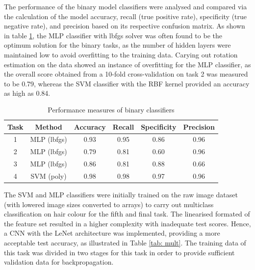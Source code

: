 \documentclass[conference]{IEEEtran}
\begin{document}
The performance of the binary model classifiers were analysed and compared via the calculation of the model accuracy, recall (true positive rate), specificity (true negative rate), and precision based on its respective confusion matrix. 
As shown in table \ref{tab: bin}, the MLP classifier with lbfgs solver was often found to be the optimum solution for the binary tasks, as the number of hidden layers were maintained low to avoid overfitting to the training data. 
Carying out rotation estimation on the data showed an instance of overfitting for the MLP classifier, as the overall score obtained from a 10-fold cross-validation on task 2 was measured to be 0.79, whereas the SVM classifier with the RBF kernel provided an accuracy as high as 0.84.

\begin{table}[htp]
\caption{Performance measures of binary classifiers}
\begin{center}
\renewcommand{\arraystretch}{1.5}
\begin{tabular}{|c|c|c|c|c|c|}
\hline
Task & Method & Accuracy & Recall & Specificity & Precision\\ \hline
1 & MLP (lbfgs) & 0.93 & 0.95 & 0.86 & 0.96\\ \hline
2 & MLP (lbfgs) & 0.79 & 0.81 & 0.60 & 0.96\\ \hline
3 & MLP (lbfgs) & 0.86 & 0.81 & 0.88 & 0.66\\ \hline
4& SVM (poly) & 0.98 & 0.98 & 0.97 & 0.96\\ \hline
\end{tabular}
\end{center}
\label{tab: bin}
\end{table}%

The SVM and MLP classifiers were initially trained on the raw image dataset (with lowered image sizes converted to arrays) to carry out multiclass classification on hair colour for the fifth and final task. The linearised formated of the feature set resulted in a higher complexity with inadequate test scores. Hence, a CNN with the LeNet architecture was implemented, providing a more acceptable test accuracy, as illustrated in Table \ref{tab: mult}.
The training data of this task was divided in two stages for this task in order to provide sufficient validation data for backpropagation. 
\end{document}
